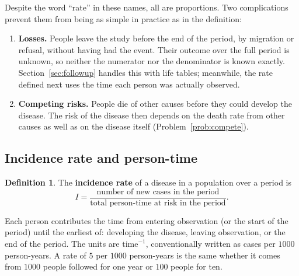 \documentclass[11pt,a4paper]{article}
\numberwithin{equation}{section}
\theoremstyle{definition}
\newtheorem{defn}[thm]{Definition}
\begin{document}
Despite the word ``rate'' in these names, all are proportions. Two complications prevent them from being as simple in practice as in
the definition:
\begin{enumerate}
\item \textbf{Losses.} People leave the study before the end of the period, by migration or refusal, without having had the event. Their
outcome over the full period is unknown, so neither the numerator nor the denominator is known exactly. Section~\ref{sec:followup}
handles this with life tables; meanwhile, the rate defined next uses the time each person was actually observed.
\item \textbf{Competing risks.} People die of other causes before they could develop the disease. The risk of the disease then depends on
the death rate from other causes as well as on the disease itself (Problem~\ref{prob:compete}).
\end{enumerate}

\subsection{Incidence rate and person-time}
\label{sec:rate}

\begin{defn}
The \textbf{incidence rate} of a disease in a population over a period is
\[
I = \frac{\text{number of new cases in the period}}{\text{total person-time at risk in the period}} .
\]
\end{defn}

Each person contributes the time from entering observation (or the start of the period) until the earliest of: developing the disease,
leaving observation, or the end of the period. The units are $\text{time}^{-1}$, conventionally written as cases per $1000$ person-years.
A rate of $5$ per $1000$ person-years is the same whether it comes from $1000$ people followed for one year or $100$ people for ten.
\end{document}
